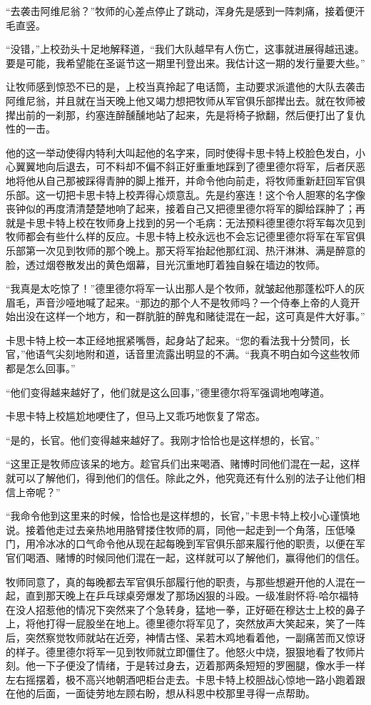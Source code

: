     “去袭击阿维尼翁？”牧师的心差点停止了跳动，浑身先是感到一阵刺痛，接着便汗毛直竖。

    “没错，”上校劲头十足地解释道，“我们大队越早有人伤亡，这事就进展得越迅速。要是可能，我希望能在圣诞节这一期里刊登出来。我估计这一期的发行量要大些。”

    让牧师感到惊恐不已的是，上校当真拎起了电话筒，主动要求派遣他的大队去袭击阿维尼翁，并且就在当天晚上他又竭力想把牧师从军官俱乐部撵出去。就在牧师被撵出前的一刹那，约塞连醉醺醺地站了起来，先是将椅子掀翻，然后便打出了复仇性的一击。

    他的这一举动使得内特利大叫起他的名字来，同时使得卡思卡特上校脸色发白，小心翼翼地向后退去，可不料却不偏不斜正好重重地踩到了德里德尔将军，后者厌恶地将他从自己那被踩得青肿的脚上推开，并命令他向前走，将牧师重新赶回军官俱乐部。这一切把卡思卡特上校弄得心烦意乱。先是约塞连！这个令人胆寒的名字像丧钟似的再度清清楚楚地响了起来，接着自己又把德里德尔将军的脚给踩肿了；再就是卡思卡特上校在牧师身上找到的另一个毛病：无法预料德里德尔将军每次见到牧师都会有些什么样的反应。卡思卡特上校永远也不会忘记德里德尔将军在军官俱乐部第一次见到牧师的那个晚上。那天将军抬起他那红润、热汗淋淋、满是醉意的脸，透过烟卷散发出的黄色烟幕，目光沉重地盯着独自躲在墙边的牧师。

    “我真是太吃惊了！”德里德尔将军一认出那人是个牧师，就皱起他那蓬松吓人的灰眉毛，声音沙哑地喊了起来。“那边的那个人不是牧师吗？一个侍奉上帝的人竟开始出没在这样一个地方，和一群肮脏的醉鬼和赌徒混在一起，这可真是件大好事。”

    卡思卡特上校一本正经地抿紧嘴唇，起身站了起来。“您的看法我十分赞同，长官，”他语气尖刻地附和道，话音里流露出明显的不满。“我真不明白如今这些牧师都是怎么回事。”

    “他们变得越来越好了，他们就是这么回事，”德里德尔将军强调地咆哮道。

    卡思卡特上校尴尬地哽住了，但马上又乖巧地恢复了常态。

    “是的，长官。他们变得越来越好了。我刚才恰恰也是这样想的，长官。”

    “这里正是牧师应该呆的地方。趁官兵们出来喝酒、赌博时同他们混在一起，这样就可以了解他们，得到他们的信任。除此之外，他究竟还有什么别的法子让他们相信上帝呢？”

    “我命令他到这里来的时候，恰恰也是这样想的，长官，”卡思卡特上校小心谨慎地说。接着他走过去亲热地用胳臂搂住牧师的肩，同他一起走到一个角落，压低嗓门，用冷冰冰的口气命令他从现在起每晚到军官俱乐部来履行他的职责，以便在军官们喝酒、赌博的时候同他们混在一起，这样就可以了解他们，赢得他们的信任。

    牧师同意了，真的每晚都去军官俱乐部履行他的职责，与那些想避开他的人混在一起，直到那天晚上在乒乓球桌旁爆发了那场凶狠的斗殴。一级准尉怀将-哈尔福特在没人招惹他的情况下突然来了个急转身，猛地一拳，正好砸在穆达士上校的鼻子上，将他打得一屁股坐在地上。德里德尔将军见了，突然放声大笑起来，笑了一阵后，突然察觉牧师就站在近旁，神情古怪、呆若木鸡地看着他，一副痛苦而又惊讶的样子。德里德尔将军一见到牧师就立即僵住了。他怒火中烧，狠狠地看了牧师片刻。他一下子便没了情绪，于是转过身去，迈着那两条短短的罗圈腿，像水手一样左右摇摆着，极不高兴地朝酒吧柜台走去。卡思卡特上校胆战心惊地一路小跑着跟在他的后面，一面徒劳地左顾右盼，想从科恩中校那里寻得一点帮助。

